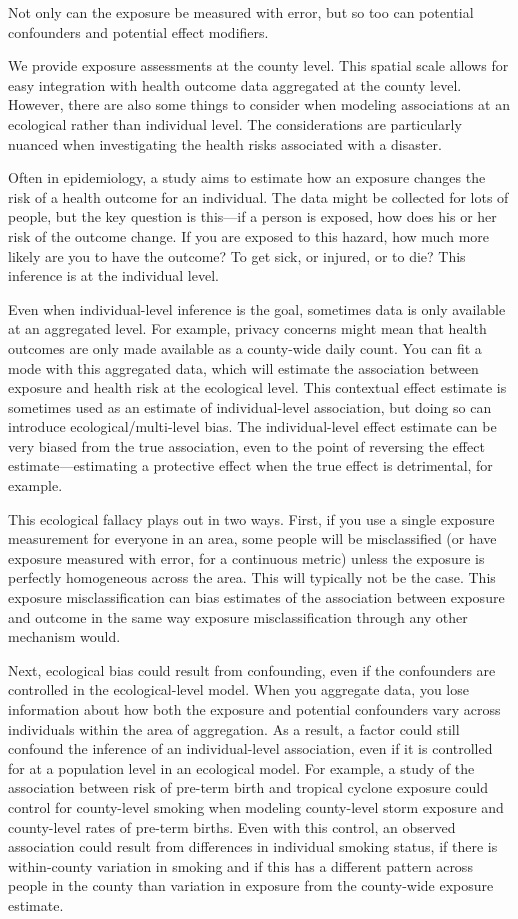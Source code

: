 Not only can the exposure be measured with error, but so too can potential
confounders and potential effect modifiers.

We provide exposure assessments at the county level. This spatial scale allows
for easy integration with health outcome data aggregated at the county level.
However, there are also some things to consider when modeling associations
at an ecological rather than individual level. The considerations are 
particularly nuanced when investigating the health risks associated with a 
disaster. 

Often in epidemiology, a study aims to estimate how an exposure changes the
risk of a health outcome for an individual. The data might be collected for
lots of people, but the key question is this---if a person is exposed, how 
does his or her risk of the outcome change. If you are exposed to this hazard, 
how much more likely are you to have the outcome? To get sick, or injured, or
to die? This inference is at the individual level. 

Even when individual-level inference is the goal, sometimes data is only 
available at an aggregated level. For example, privacy concerns might
mean that health outcomes are only made available as a county-wide daily 
count. You can fit a mode with this aggregated data, which will estimate the
association between exposure and health risk at the ecological level. This
contextual effect estimate is sometimes used as an estimate of individual-level
association, but doing so can introduce ecological/multi-level bias. The 
individual-level effect estimate can be very biased from the true association, 
even to the point of reversing the effect estimate---estimating a protective
effect when the true effect is detrimental, for example.

This ecological fallacy plays out in two ways. First, if you use a single 
exposure measurement for everyone in an area, some people will be misclassified
(or have exposure measured with error, for a continuous metric) unless the 
exposure is perfectly homogeneous across the area. This will typically not
be the case. This exposure misclassification can bias estimates of the 
association between exposure and outcome in the same way exposure 
misclassification through any other mechanism would.

Next, ecological bias could result from confounding, even if the confounders
are controlled in the ecological-level model. When you aggregate data, you 
lose information about how both the exposure and potential confounders vary
across individuals within the area of aggregation. As a result, a factor
could still confound the inference of an individual-level association, even 
if it is controlled for at a population level in an ecological model. For 
example, a study of the association between risk of pre-term birth and 
tropical cyclone exposure could control for county-level smoking when 
modeling county-level storm exposure and county-level rates of pre-term births.
Even with this control, an observed association could result from differences
in individual smoking status, if there is within-county variation in 
smoking and if this has a different pattern across people in the county than
variation in exposure from the county-wide exposure estimate.


